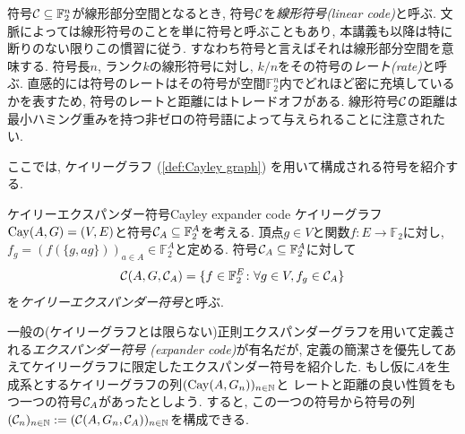 符号$\mathcal{C}\subseteq\mathbb{F}_2^n$が線形部分空間となるとき, 符号$\mathcal{C}$を\emph{線形符号(linear code)}と呼ぶ.
文脈によっては線形符号のことを単に符号と呼ぶこともあり,
本講義も以降は特に断りのない限りこの慣習に従う.
すなわち符号と言えばそれは線形部分空間を意味する.
符号長$n$, ランク$k$の線形符号に対し,
$k/n$をその符号の\emph{レート(rate)}と呼ぶ.
直感的には符号のレートはその符号が空間$\mathbb{F}_2^n$内でどれほど密に充填しているかを表すため,
符号のレートと距離にはトレードオフがある.
線形符号$\mathcal{C}$の距離は最小ハミング重みを持つ非ゼロの符号語によって与えられることに注意されたい.

ここでは, ケイリーグラフ (\cref{def:Cayley graph}) を用いて構成される符号を紹介する.
\begin{definition}{ケイリーエクスパンダー符号}{Cayley expander code}
    ケイリーグラフ$\mathrm{Cay}(A,G)=(V,E)$と符号$\mathcal{C}_A\subseteq\mathbb{F}_2^A$を考える.
    頂点$g\in V$と関数$f\colon E \to \mathbb{F}_2$に対し, $f_g=(f(\{g,ag\}))_{a\in A}\in \mathbb{F}_2^A$と定める.
    符号$\mathcal{C}_A\subseteq \mathbb{F}_2^A$に対して
    \begin{align*}
        \mathcal{C}(A,G,\mathcal{C}_A)=\{f\in\mathbb{F}_2^E\colon \forall g\in V, f_g \in \mathcal{C}_A\}
    \end{align*}
    を\emph{ケイリーエクスパンダー符号}と呼ぶ.
\end{definition}
一般の(ケイリーグラフとは限らない)正則エクスパンダーグラフを用いて定義される\emph{エクスパンダー符号 (expander code)}が有名だが, 定義の簡潔さを優先してあえてケイリーグラフに限定したエクスパンダー符号を紹介した.
もし仮に$A$を生成系とするケイリーグラフの列$(\mathrm{Cay}(A,G_n))_{n\in\mathbb{N}}$と
レートと距離の良い性質をもつ一つの符号$\mathcal{C}_A$があったとしよう.
すると, この一つの符号から符号の列$(\mathcal{C}_n)_{n\in\mathbb{N}} \mathrel{:=} (\mathcal{C}(A,G_n,\mathcal{C}_A))_{n\in\mathbb{N}}$を構成できる.

